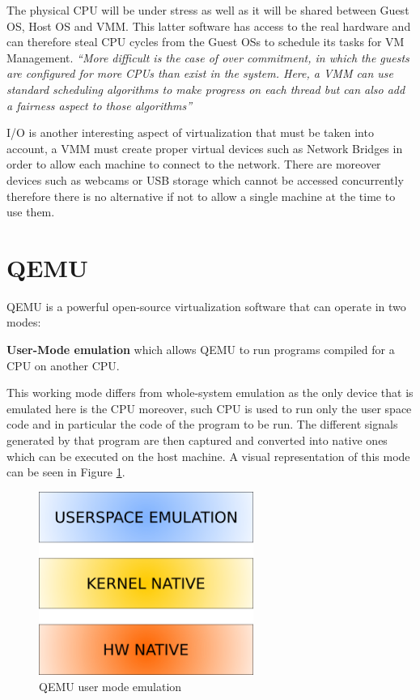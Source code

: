 The physical CPU will be under stress as well as it will be shared between Guest OS, Host OS and VMM. This latter software has access to the real hardware and can therefore steal CPU cycles from the Guest OSs to schedule its tasks for VM Management.
\textit{``More difficult is the case of over commitment, in which the guests are configured for more CPUs than exist in the system. Here, a VMM can use standard scheduling algorithms to make progress on each thread but can also add a fairness aspect to those algorithms''}~\cite{os}

I/O is another interesting aspect of virtualization that must be taken into account, a VMM must create proper virtual devices such as Network Bridges in order to allow each machine to connect to the network. There are moreover devices such as webcams or USB storage which cannot be accessed concurrently therefore there is no alternative if not to allow a single machine at the time to use them.


\section{QEMU}

QEMU is a powerful open-source virtualization software that can operate in two modes: 

\textbf{User-Mode emulation} which allows QEMU to run programs compiled for a CPU on another CPU.

This working mode differs from whole-system emulation as the only device that is emulated here is the CPU moreover, such CPU is used to run only the user space code and in particular the code of the program to be run. The different signals generated by that program are then captured and converted into native ones which can be executed on the host machine. A visual representation of this mode can be seen in Figure \ref{fig:quser}.

\begin{figure}[htp]
\centering
\includegraphics[width=7cm]{images/qemu-user.png}
\caption{QEMU user mode emulation~\cite{quser}}
\label{fig:quser}
\end{figure}

